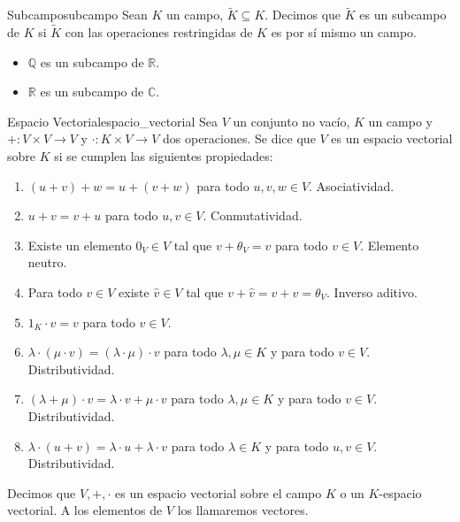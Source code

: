 \begin{definition}{Subcampo}{subcampo}
Sean $K$ un campo, $\tilde{K} \subseteq K$. Decimos que $\tilde{K}$ es un subcampo de $K$ si $\tilde{K}$ con las operaciones restringidas de $K$ es por sí mismo un campo.
\end{definition}

\begin{example}{}{}
    \begin{itemize}
        \item $\mathbb{Q}$ es un subcampo de $\mathbb{R}$.
        \item $\mathbb{R}$ es un subcampo de $\mathbb{C}$.
    \end{itemize}
\end{example}

\begin{definition}{Espacio Vectorial}{espacio_vectorial}
    Sea $V$ un conjunto no vacío, $K$ un campo y $+:V\times V\rightarrow V$ y $\cdot:K\times V\rightarrow V$ dos operaciones. Se dice que $V$ es un espacio vectorial sobre $K $ si se cumplen las siguientes propiedades: 
    \begin{enumerate}
        \item $(u+v)+w = u+(v+w)$ para todo $u,v,w\in V$. Asociatividad.
        \item $u+v = v+u$ para todo $u,v\in V$. Conmutatividad.
        \item Existe un elemento $0_V\in V$ tal que $v+\theta_V=v$ para todo $v\in V$. Elemento neutro.
        \item Para todo $v \in V$ existe $\hat{v} \in V$ tal que $v+\hat{v}=\hat{v}+v = \theta_V$. Inverso aditivo.
        \item $1_K \cdot v = v$ para todo $v\in V$. 
        \item $\lambda \cdot(\mu \cdot v) = (\lambda \cdot \mu) \cdot v$ para todo $\lambda,\mu \in K$ y para todo $v\in V$. Distributividad.
        \item $(\lambda + \mu) \cdot v = \lambda \cdot v + \mu \cdot v$ para todo $\lambda,\mu \in K$ y para todo $v\in V$. Distributividad.
        \item $\lambda \cdot (u+v) = \lambda \cdot u + \lambda \cdot v$ para todo $\lambda \in K$ y para todo $u,v\in V$. Distributividad.
    \end{enumerate}
    Decimos que $V,+,\cdot$ es un espacio vectorial sobre el campo $K$ o un $K$-espacio vectorial. A los elementos de $V$ los llamaremos vectores.
\end{definition}


